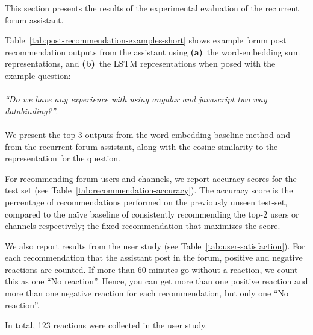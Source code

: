 \documentclass[11pt]{article}
\begin{document}
This section presents the results of the experimental evaluation of the recurrent forum assistant.


Table~\ref{tab:post-recommendation-examples-short} shows example forum post recommendation outputs from the assistant using \textbf{(a)}~the word-embedding sum representations, and \textbf{(b)}~the LSTM representations when posed with the example question: \\ ~ \\ %
\textit{``Do we have any experience with using angular and javascript two way databinding?''}. \\ ~ \\
We present the top-3 outputs from the word-embedding baseline method and from the recurrent forum assistant, along with the cosine similarity to the representation for the question.

For recommending forum users and channels, we report accuracy scores for the test set (see Table~\ref{tab:recommendation-accuracy}). The accuracy score is the percentage of recommendations performed on the previously unseen test-set, compared to the na\"ive baseline of consistently recommending the top-$2$ users or channels respectively; the fixed recommendation that maximizes the score.

We also report results from the user study (see Table~\ref{tab:user-satisfaction}). For each recommendation that the assistant post in the forum, positive and negative reactions are counted. If more than $60$ minutes go without a reaction, we count this as one ``No reaction''. Hence, you can get more than one positive reaction and more than one negative reaction for each recommendation, but only one ``No reaction''.


In total, 123 reactions were collected in the user study.
\end{document}
